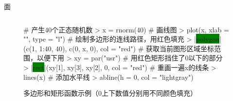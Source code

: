 \documentclass{beamerthemeMono}
\begin{document}
\begin{frame}[t,fragile]{\subsecname}{面}
\begin{onlyenv}
\begin{figure}
\begin{columns}
    \begin{column}[c]{.6\textwidth}
\begin{rcode}
# 产生40个正态随机数
> x = rnorm(40)
# 画线图
> plot(x, xlab = "", type = "l")
# 绘制多边形的连线路径，用红色填充
> |\colorbox{green}{polygon}|(c(1, 1:40, 40), c(0, x, 0), col = "red")
# 获取当前图形区域坐标范围，以便下用
> xy = par("usr")
# 用红色矩形挡住了0以下的部分
> |\colorbox{green}{rect}|(xy[1], xy[3], xy[2], 0, col = "red")
# 重画一遍x的线条
> lines(x)
# 添加水平线
> abline(h = 0, col = "lightgray")
\end{rcode}
    \end{column}
  \end{columns}
  \caption{多边形和矩形函数示例（0上下数值分别用不同颜色填充）}
\end{figure}
\end{onlyenv}  
\end{frame}
\end{document}
